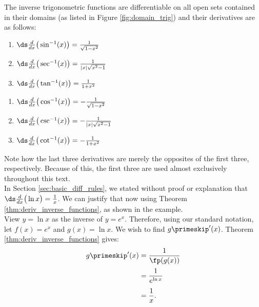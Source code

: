 {The inverse trigonometric functions are differentiable on all open sets contained in their domains (as listed in Figure \ref{fig:domain_trig}) and their derivatives are as follows:\\

\noindent	\begin{minipage}{.5\specialboxlength}\small
	\begin{enumerate}
	\item		$\ds \frac{d}{dx}\big(\sin^{-1}(x)\big) = \frac{1}{\sqrt{1-x^2}}$ 
	\item		$\ds \frac{d}{dx}\big(\sec^{-1}(x)\big) = \frac{1}{|x|\sqrt{x^2-1}}$
	\item		$\ds \frac{d}{dx}\big(\tan^{-1}(x)\big) = \frac{1}{1+x^2}$
	\end{enumerate}
	\end{minipage}
	\begin{minipage}{.5\specialboxlength}\small
	\begin{enumerate}\addtocounter{enumi}{3}
	\item		$\ds \frac{d}{dx}\big(\cos^{-1}(x)\big) = -\frac{1}{\sqrt{1-x^2}}$ 
	\item		$\ds \frac{d}{dx}\big(\csc^{-1}(x)\big) = -\frac{1}{|x|\sqrt{x^2-1}}$
	\item		$\ds \frac{d}{dx}\big(\cot^{-1}(x)\big) = -\frac{1}{1+x^2}$
	\end{enumerate}
	\normalsize
	\end{minipage}
}			

Note how the last three derivatives are merely the opposites of the first three, respectively. Because of this, the first three are used almost exclusively throughout this text.\\

In Section \ref{sec:basic_diff_rules}, we stated without proof or explanation that $\ds \frac{d}{dx}\big(\ln x\big) = \frac{1}{x}$. We can justify that now using Theorem \ref{thm:deriv_inverse_functions}, as shown in the example.\\

{View $y= \ln x$ as the inverse of $y = e^x$. Therefore, using our standard notation, let $f(x) = e^x$ and $g(x) = \ln x$. We wish to find $g\primeskip'(x)$. Theorem \ref{thm:deriv_inverse_functions} gives:
		\begin{align*}
		g\primeskip'(x) &= \frac{1}{\fp(g(x))} \\
					&=	\frac{1}{e^{\ln x}}\rule{0pt}{15pt} \\
					&= \frac{1}{x}.\rule{0pt}{17pt}
		\end{align*}}

